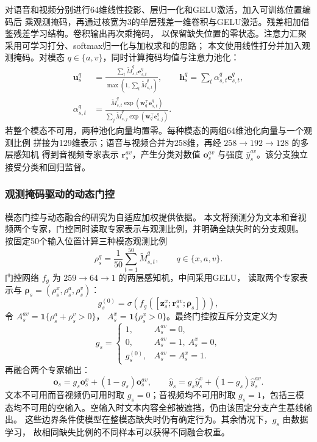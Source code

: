 \documentclass[bwprint]{gmcmthesis}
\begin{document}
对语音和视频分别进行64维线性投影、层归一化和GELU激活，加入可训练位置编码后
乘观测掩码，再通过核宽为3的单层残差一维卷积与GELU激活。残差相加借鉴残差学习结构\citep{he2016residual}。卷积输出再次乘掩码，
以保留缺失位置的零状态。注意力汇聚采用可学习打分、softmax归一化与加权求和的思路\citep{yang2016attention}；
本文使用线性打分并加入观测掩码。对模态 $q\in\{a,v\}$，同时计算掩码均值与注意力池化：
\begin{equation}
 \begin{aligned}
 \boldsymbol u_s^q&=\frac{\sum_t\widetilde M^q_{s,t}\boldsymbol e^q_{s,t}}
 {\max(1,\sum_t\widetilde M^q_{s,t})},\qquad
 \boldsymbol h_s^q=\sum_t\alpha^q_{s,t}\boldsymbol e^q_{s,t},\\
 \alpha^q_{s,t}&=\frac{\widetilde M^q_{s,t}\exp(\boldsymbol w_q^\top\boldsymbol e^q_{s,t})}
 {\sum_j\widetilde M^q_{s,j}\exp(\boldsymbol w_q^\top\boldsymbol e^q_{s,j})}.
 \end{aligned}
 \label{eq:p2-av-pool}
\end{equation}
若整个模态不可用，两种池化向量均置零。每种模态的两组64维池化向量与一个观测比例
拼接为129维表示；语音与视频合并为258维，再经 $258\to192\to128$ 的多层感知机
得到音视频专家表示 $\boldsymbol r_s^{av}$，产生分类对数值 $\boldsymbol o_s^{av}$
与强度 $\hat y_s^{av}$。该分支独立接受分类和回归监督。

\subsubsection{观测掩码驱动的动态门控}

模态门控与动态融合的研究\citep{miao2023gating,wei2024nontext,chen2026experts}为自适应加权提供依据。
本文将预测分为文本和音视频两个专家，门控同时读取专家表示与观测比例，并明确全缺失时的分支规则。
按固定50个输入位置计算三种模态观测比例
\begin{equation}
 \rho_s^q=\frac{1}{50}\sum_{t=1}^{50}\widetilde M^q_{s,t},
 \qquad q\in\{x,a,v\}.
 \label{eq:p2-observed-ratio}
\end{equation}
门控网络 $f_g$ 为 $259\to64\to1$ 的两层感知机，中间采用GELU，
读取两个专家表示与 $\boldsymbol\rho_s=(\rho_s^x,\rho_s^a,\rho_s^v)$：
\begin{equation}
 g_s^{(0)}=\sigma\!\left(f_g([\boldsymbol z_s^x;\boldsymbol r_s^{av};\boldsymbol\rho_s])\right),
 \label{eq:p2-gate-value}
\end{equation}
令 $A_s^{av}=\mathbf1\{\rho_s^a+\rho_s^v>0\}$，
$A_s^x=\mathbf1\{\rho_s^x>0\}$。最终门控按互斥分支定义为
\[
 g_s=\begin{cases}
 1,& A_s^{av}=0,\\
 0,& A_s^{av}=1,\ A_s^x=0,\\
 g_s^{(0)},& A_s^{av}=A_s^x=1.
 \end{cases}
\]
再融合两个专家输出：
\begin{equation}
 \boldsymbol o_s=g_s\boldsymbol o_s^x+(1-g_s)\boldsymbol o_s^{av},\qquad
 \hat y_s=g_s\hat y_s^x+(1-g_s)\hat y_s^{av}.
 \label{eq:p2-gate}
\end{equation}
文本不可用而音视频仍可用时取 $g_s=0$；音视频均不可用时取 $g_s=1$，包括三模态均不可用的空输入。空输入时文本内容全部被遮挡，仍由该固定分支产生基线输出。
这些边界条件使模型在整模态缺失时仍有确定行为。其余情况下，$g_s$ 由数据学习，
故相同缺失比例的不同样本可以获得不同融合权重。
\end{document}
